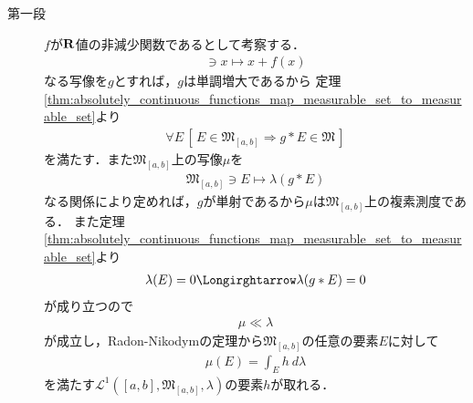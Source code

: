 	\begin{sketch}\mbox{}
		\begin{description}
			\item[第一段]
				$f$が$\mathbf{R}$値の非減少関数であるとして考察する．
				\begin{align}
					[a,b] \ni x \longmapsto x + f(x)
				\end{align}
				なる写像を$g$とすれば，$g$は単調増大であるから
				定理\ref{thm:absolutely_continuous_functions_map_measurable_set_to_measurable_set}より
				\begin{align}
					\forall E\, \left[\, E \in \mathfrak{M}_{[a,b]} \Longrightarrow g \ast E \in \mathfrak{M}\, \right]
				\end{align}
				を満たす．また$\mathfrak{M}_{[a,b]}$上の写像$\mu$を
				\begin{align}
					\mathfrak{M}_{[a,b]} \ni E \longmapsto \lambda(g \ast E)
				\end{align}
				なる関係により定めれば，$g$が単射であるから$\mu$は$\mathfrak{M}_{[a,b]}$上の複素測度である．
				また定理\ref{thm:absolutely_continuous_functions_map_measurable_set_to_measurable_set}より
				\begin{align}
					\lambda(E) = 0 \Longirghtarrow \lambda(g \ast E) = 0
				\end{align}
				が成り立つので
				\begin{align}
					\mu \ll \lambda
				\end{align}
				が成立し，Radon-Nikodymの定理から$\mathfrak{M}_{[a,b]}$の任意の要素$E$に対して
				\begin{align}
					\mu(E) = \int_E h\ d\lambda
				\end{align}
				を満たす$\mathscr{L}^1([a,b],\mathfrak{M}_{[a,b]},\lambda)$の要素$h$が取れる．
		\end{description}
	\end{sketch}